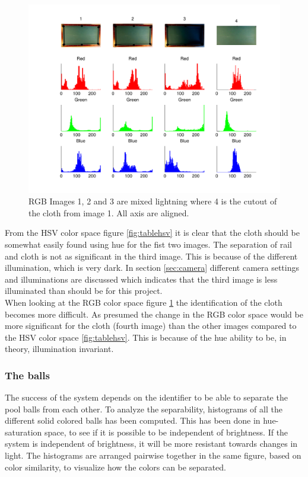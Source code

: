 \begin{figure}[H]
\begin{center}
\leavevmode
\includegraphics[width=1\textwidth]{images/rgb_hist_table}
\end{center}
\caption{RGB Images 1, 2 and 3 are mixed lightning where 4 is the cutout of the cloth from image 1. All axis are aligned.}
\label{fig:tablergb}
\end{figure}

From the HSV color space figure \ref{fig:tablehsv} it is clear that the cloth should be somewhat easily found using hue for the fist two images. The separation of rail and cloth is not as significant in the third image. This is because of the different illumination, which is very dark. In section \ref{sec:camera} different camera settings and illuminations are discussed which indicates that the third image is less illuminated than should be for this project.\\

When looking at the RGB color space figure \ref{fig:tablergb} the identification of the cloth becomes more difficult. As presumed the change in the RGB color space would be more significant for the cloth (fourth image) than the other images compared to the HSV color space \ref{fig:tablehsv}. This is because of the hue ability to be, in theory, illumination invariant.\\

\subsubsection{The balls}
The success of the system depends on the identifier to be able to separate the pool balls from each other. To analyze the separability, histograms of all the different solid colored balls has been computed. This has been done in hue-saturation space, to see if it is possible to be independent of brightness. If the system is independent of brightness, it will be more resistant towards changes in light. The histograms are arranged pairwise together in the same figure, based on color similarity, to visualize how the colors can be separated.

